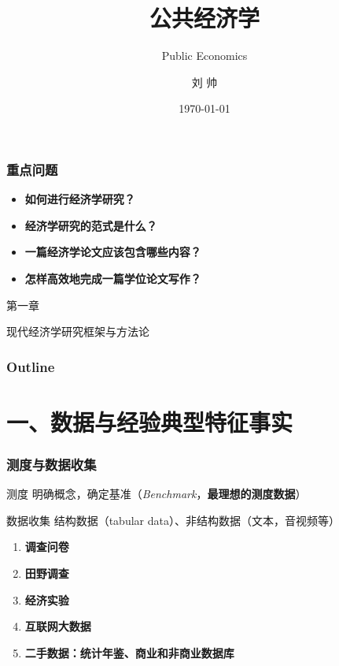 \documentclass[aspectratio=169, 12pt]{beamer}
\title{公共经济学}
\subtitle{Public Economics}
\author[LIU ShHUAI]{刘 {  } 帅}
\institute{山西师范大学 {  } 经济与管理学院}
\date{\today}
\begin{document}
\maketitle

\begin{frame}[plain]
    \frametitle{重点问题}
    \begin{itemize}
        \item \textbf{如何进行经济学研究？}
        \item \textbf{经济学研究的范式是什么？}
        \item \textbf{一篇经济学论文应该包含哪些内容？}
        \item \textbf{怎样高效地完成一篇学位论文写作？}
    \end{itemize}
\end{frame}

\begin{frame}[standout]
    第一章\par
    \addtolength{\parskip}{.4em}
    现代经济学研究框架与方法论
\end{frame}

\begin{frame}[plain]
    \frametitle{Outline}
    \tableofcontents[hideallsubsections]
  \end{frame}

\section{一、数据与经验典型特征事实}

\begin{frame}[plain]
    \frametitle{测度与数据收集}
    \begin{block}{测度}
        明确概念，确定基准（\emph{Benchmark}，\textbf{最理想的测度数据}）
    \end{block}
    \begin{block}{数据收集}
        结构数据（tabular data）、非结构数据（文本，音视频等）\par
        \addtolength{\parskip}{.8em}
        \begin{enumerate}
            \item  \textbf{调查问卷}
            \item  \textbf{田野调查}
            \item  \textbf{经济实验}
            \item  \textbf{互联网大数据}
            \item  \textbf{二手数据：统计年鉴、商业和非商业数据库}
        \end{enumerate}
    \end{block}
\end{frame}
\end{document}

